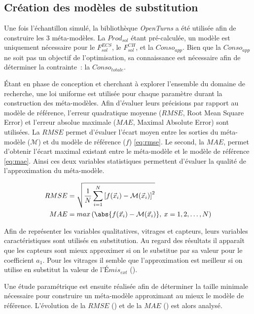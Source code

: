 \subsection{Création des modèles de substitution} %
\label{sub:creation_des_modeles_de_substitution}
Une fois l’échantillon simulé, la bibliothèque \textit{OpenTurns} a été utilisée
afin de construire les \num{3} méta-modèles. La $Prod_{sol}$ étant pré-calculée,
un modèle est uniquement nécessaire pour le $F_{sol}^{ECS}$, le $F_{sol}^{CH}$, et la $Conso_{app}$.
Bien que la $Conso_{app}$ ne soit pas un objectif de l’optimisation, sa connaissance est
nécessaire afin de déterminer la contrainte~: la $Conso_{totale}$.

Étant en phase de conception et cherchant à explorer l’ensemble du domaine de recherche,
une loi uniforme est utilisée pour chaque paramètre durant la construction des méta-modèles.
Afin d’évaluer leurs précisions par rapport au modèle de référence, l’erreur
quadratique moyenne ($RMSE$, Root Mean Square Error) et l’erreur absolue maximale ($MAE$,
Maximal Absolute Error) sont utilisées. La $RMSE$ permet d’évaluer l’écart moyen entre
les sorties du méta-modèle ($\mathcal{M}$) et du modèle de référence ($f$)
\eqref{eq:rmse}. Le second, la $MAE$, permet d’obtenir l’écart maximal existant entre le
méta-modèle et le modèle de référence \eqref{eq:mae}. Ainsi ces deux variables statistiques
permettent d’évaluer la qualité de l’approximation du méta-modèle.

\begin{align}
  \label{eq:rmse}
  RMSE &= \sqrt{\frac{1}{N}\sum^{N}_{i=1} \left[ f(\vec{x}_{i}) - \mathcal{M}(\vec{x}_{i}) \right]^{2} } \\
  \label{eq:mae}
  MAE  &= max \left( \abs{f(\vec{x}_{i}) - \mathcal{M}(\vec{x}_{i})}, \: x = 1, 2, \dotsc, N \right)
\end{align}

Afin de représenter les variables qualitatives, vitrages et capteurs, leurs variables
caractéristiques sont utilisés en substitution. Au regard des résultats il apparaît que
les capteurs sont mieux approximer si on le substitue par sa valeur pour le coefficient
$a_{1}$. Pour les vitrages il semble que l’approximation est meilleur si on utilise en
substitut la valeur de l’$Émis_{ext}$  ().

Une étude paramétrique est ensuite réalisée afin de déterminer la taille minimale
nécessaire pour construire un méta-modèle approximant au mieux le modèle de référence.
L’évolution de la $RMSE$ () et de la $MAE$ () est
alors analysé.


